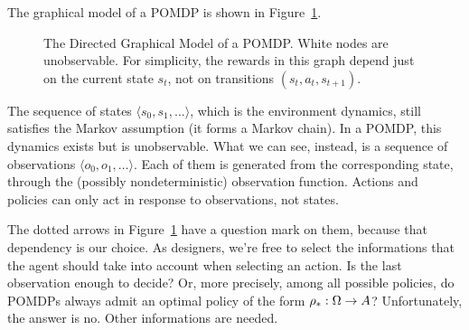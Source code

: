 The graphical model of a POMDP is shown in Figure~\ref{fig:pomdp}.
\begin{figure}

	\centering
	\caption{The Directed Graphical Model of a POMDP. White nodes are
	unobservable. For simplicity, the rewards in this graph depend just on the
	current state $s_t$, not on transitions ${(s_t, a_t, s_{t+1})}$.}
	\label{fig:pomdp}
\end{figure}
The sequence of states ${\langle s_0, s_1, \dots \rangle}$, which is the
environment dynamics, still satisfies the Markov assumption (it forms a Markov
chain). In a POMDP, this dynamics exists but is unobservable. What we can
see, instead, is a sequence of observations ${ \langle o_0, o_1, \dots
\rangle}$. Each of them is generated from the corresponding state, through the
(possibly nondeterministic) observation function. Actions and policies can
only act in response to observations, not states.

The dotted arrows in Figure~\ref{fig:pomdp} have a question mark on them,
because that dependency is our choice. As designers, we're free to select the
informations that the agent should take into account when selecting an action.
Is the last observation enough to decide? Or, more precisely, among all
possible policies, do POMDPs always admit an optimal policy of the form
${\rho}_*: \Omega \to A$? Unfortunately, the answer is no. Other
informations are needed.

